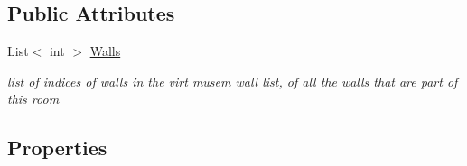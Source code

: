 \subsection*{Public Attributes}
\begin{DoxyCompactItemize}
\item 
List$<$ int $>$ \mbox{\hyperlink{class_room_a22669d53756bbfecb106f4f6c9529bb9}{Walls}}
\begin{DoxyCompactList}\small\item\em list of indices of walls in the virt musem wall list, of all the walls that are part of this room \end{DoxyCompactList}\end{DoxyCompactItemize}
\subsection*{Properties}
